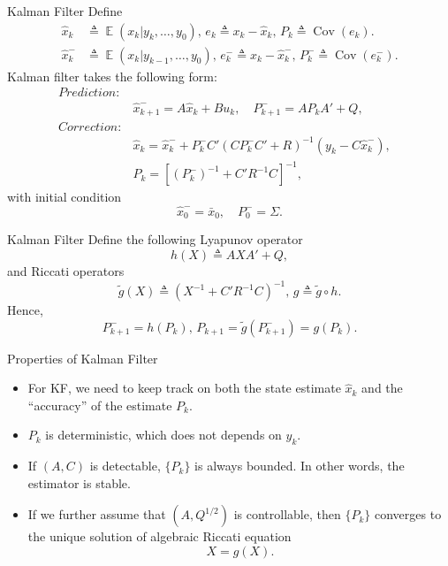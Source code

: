 \documentclass[10pt]{beamer}
\DeclareMathOperator{\1}{\textbf{1}}
\DeclareMathOperator{\Cov}{Cov}
\DeclareMathOperator{\E}{\mathbb E}
\begin{document}
\begin{frame}{Kalman Filter}
  Define 
  \begin{displaymath}
    \begin{split}
      \hat x_k &\triangleq \E (x_k|y_k,\dots,y_0),\,e_k\triangleq  x_k -\hat x_k, \,P_k \triangleq \Cov(e_k).\\
      \hat x_k^- &\triangleq \E (x_k|y_{k-1},\dots,y_0),\,e_k^-\triangleq  x_k -\hat x_k^-, \,P_k^- \triangleq \Cov(e_k^-).
    \end{split}
  \end{displaymath}
  Kalman filter takes the following form:
  \begin{align*}
    Prediction:&&\\
	       &\hat x _{k + 1}^-  = A \hat x_{k} + Bu_k  , \quad P_{k + 1}^-  = AP_{k} A'  + Q ,\\
    Correction:&&\\
	       &\hat x_{k} = \hat x_{k}^-  + P_k^- C'(CP_k^- C'+R)^{-1} (y_k  - C \hat x _{k}^- ) , \\
	       &P_{k} = \left[(P_{k}^-)^{-1} + C' R^{-1} C \right]^{-1},
  \end{align*}
  with initial condition
  \begin{displaymath}
    \hat x_{0}^-  = \bar x_0 ,\quad P_{0}^-  = \Sigma.
  \end{displaymath}
\end{frame}

\begin{frame}{Kalman Filter}
  Define the following Lyapunov operator
  \begin{displaymath}
    h(X) \triangleq AXA'  + Q, 
  \end{displaymath}
  and Riccati operators
  \begin{displaymath}
    \tilde g(X) \triangleq (X^{-1} + C'R^{-1}C)^{-1},\,g \triangleq \tilde g\circ h.
  \end{displaymath}
  Hence,
  \begin{displaymath}
    P_{k+1}^- = h(P_k),\,P_{k+1} =\tilde g(P_{k+1}^-) =  g(P_k). 
  \end{displaymath}
\end{frame}

\begin{frame}{Properties of Kalman Filter}
  \begin{itemize}
    \item For KF, we need to keep track on both the state estimate $\hat x_k$ and the ``accuracy'' of the estimate $P_k$.
    \item $P_k$ is deterministic, which does not depends on $y_k$.
    \item If $(A,C)$ is detectable, $\{P_k\}$ is always bounded. In other words, the estimator is stable.
    \item If we further assume that $(A,Q^{1/2})$ is controllable, then $\{P_k\}$ converges to the unique solution of algebraic Riccati equation 
      \begin{displaymath}
	X = g(X). 
      \end{displaymath}
  \end{itemize}
\end{frame}
\end{document}
